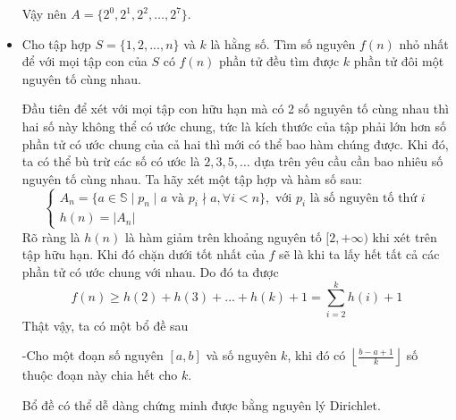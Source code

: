 \documentclass[11pt]{scrartcl}
\begin{document}
\begin{itemize}[label=, leftmargin=0em, itemsep=0.5em]
\begin{sol}
        Vậy nên  $A = \{2^0,2^1,2^2,\dots,2^7\}$.
    \end{sol}
    \item \begin{bt}
        Cho tập hợp $S = \{1,2,...,n\}$ và $k$ là hằng số. Tìm số nguyên $f(n)$ nhỏ nhất để với mọi tập con của $S$ có $f(n)$ phần tử đều tìm được $k$ phần tử đôi một nguyên tố cùng nhau.
    \end{bt}
    \begin{sol} Đầu tiên để xét với mọi tập con hữu hạn mà có 2 số nguyên tố cùng nhau thì hai số này không thể có ước chung, tức là kích thước của tập phải lớn hơn số phần tử có ước chung của cả hai thì mới có thể bao hàm chúng được. Khi đó, ta có thể bù trừ các số có ước là $2,3,5,\dots$ dựa trên yêu cầu cần bao nhiêu số nguyên tố cùng nhau.
        Ta hãy xét một tập hợp và hàm số sau:
        \[
            \left\{
            \begin{array}{l}
                A_n = \{a \in \mathbb{S} \mid p_n \mid a \text{ và } p_{i} \nmid a, \forall i < n\}, \text{ với } p_i \text{ là số nguyên tố thứ } i\\
                h(n) = |A_n|
            \end{array}
            \right.
        \]
        Rõ ràng là $h(n)$ là hàm giảm trên khoảng nguyên tố $[2,+\infty)$ khi xét trên tập hữu hạn. Khi đó chặn dưới tốt nhất của $f$ sẽ là khi ta lấy hết tất cả các phần tử có ước chung với nhau. Do đó ta được
        \[
            f(n) \geq  h(2) + h(3) + ... + h(k) + 1 = \sum_{i = 2}^k h(i) + 1
        \]
        Thật vậy, ta có một bổ đề sau

        
        \begin{theo} -Cho một đoạn số nguyên $[a,b]$ và số nguyên $k$, khi đó có $\left\lfloor\frac{b - a + 1}{k}\right\rfloor$ số thuộc đoạn này chia hết cho $k$.
        \end{theo}
        Bổ đề có thể dễ dàng chứng minh được bằng nguyên lý Dirichlet.




\end{sol}
\end{itemize}
\end{document}
